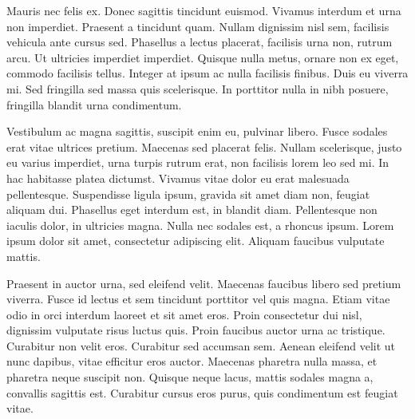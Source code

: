 Mauris nec felis ex. Donec sagittis tincidunt euismod. Vivamus interdum et urna non imperdiet. Praesent a tincidunt quam. Nullam dignissim nisl sem, facilisis vehicula ante cursus sed. Phasellus a lectus placerat, facilisis urna non, rutrum arcu. Ut ultricies imperdiet imperdiet. Quisque nulla metus, ornare non ex eget, commodo facilisis tellus. Integer at ipsum ac nulla facilisis finibus. Duis eu viverra mi. Sed fringilla sed massa quis scelerisque. In porttitor nulla in nibh posuere, fringilla blandit urna condimentum.

Vestibulum ac magna sagittis, suscipit enim eu, pulvinar libero. Fusce sodales erat vitae ultrices pretium. Maecenas sed placerat felis. Nullam scelerisque, justo eu varius imperdiet, urna turpis rutrum erat, non facilisis lorem leo sed mi. In hac habitasse platea dictumst. Vivamus vitae dolor eu erat malesuada pellentesque. Suspendisse ligula ipsum, gravida sit amet diam non, feugiat aliquam dui. Phasellus eget interdum est, in blandit diam. Pellentesque non iaculis dolor, in ultricies magna. Nulla nec sodales est, a rhoncus ipsum. Lorem ipsum dolor sit amet, consectetur adipiscing elit. Aliquam faucibus vulputate mattis.

Praesent in auctor urna, sed eleifend velit. Maecenas faucibus libero sed pretium viverra. Fusce id lectus et sem tincidunt porttitor vel quis magna. Etiam vitae odio in orci interdum laoreet et sit amet eros. Proin consectetur dui nisl, dignissim vulputate risus luctus quis. Proin faucibus auctor urna ac tristique. Curabitur non velit eros. Curabitur sed accumsan sem. Aenean eleifend velit ut nunc dapibus, vitae efficitur eros auctor. Maecenas pharetra nulla massa, et pharetra neque suscipit non. Quisque neque lacus, mattis sodales magna a, convallis sagittis est. Curabitur cursus eros purus, quis condimentum est feugiat vitae.